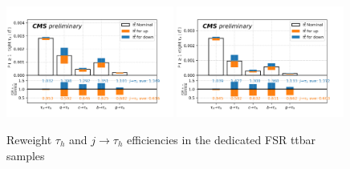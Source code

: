 \begin{figure}
    \centering
    \includegraphics[width=0.49\textwidth]{chapters/Appendix/sectionTTSyst/figures/2020_MCRatio_fsr_tauGenFlavor_tauTight.png}
    \includegraphics[width=0.49\textwidth]{chapters/Appendix/sectionTTSyst/figures/2020_MCRatio_fsr_tauGenFlavor_tauVTight.png}
    \caption{Reweight $\tau_h$ and $j \to \tau_h$ efficiencies in the dedicated FSR ttbar samples}
    \label{fig:appendix:reweighttt:sf_fsr}
\end{figure}

